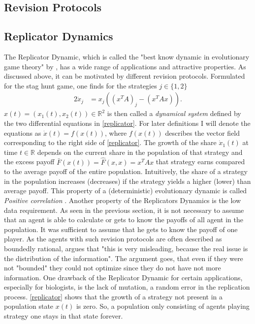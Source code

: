 \documentclass[12pt]{article}
\newcommand{\realnumb}{\mathbb{R}}
\begin{document}
\subsection{Revision Protocols}


\subsection{Replicator Dynamics}
The Replicator Dynamic, which is called the "best know dynamic in
evolutionary game theory" by \cite{sandholm_populaton_2010}, has a wide range of applications
and attractive properties. As discussed above, it can be motivated by 
different revision protocols. Formulated for the stag hunt game, one finds for
the strategies $j \in \{1,2\}$
\begin{alignat}{2}
        \dot{x}_j &= x_j\left(\left(x^T A\right)_j - \left(x^T A x\right)\right) 
        \label{replicator}.
\end{alignat}
$x(t)=(x_1(t), x_2(t)) \in \realnumb^2$ is then called a \textit{dynamical
system} defined by the two differential equations in \eqref{replicator}. For
later definitions I will denote the equations as $\dot{x}(t) = f(x(t))$, where
$f(x(t))$ describes the vector field corresponding to the right side of
\eqref{replicator}. 
The growth of the share $\dot{x}_1(t)$ at time $t \in \realnumb$ depends on the current share in the
population of that strategy and the excess payoff $\bar{F}(x(t)) 
= \hat{F}(x,x) = x^T A x$ that strategy earns 
compared to the average payoff of the entire population. Intuitively, the
share of a strategy in the population increases (decreases) if the strategy
yields a higher (lower) than average payoff. This property of a (deterministic)
evolutionary dynamic is called \textit{Positive correlation} \cite{sandholm}.
Another property of the Replicators Dynamics is the low data requirement. As 
seen in the previous section, it is not necessary to assume that an agent
is able to calculate or gets to know the payoffs of all agent in the population.
It was sufficient to assume that he gets to know the payoff of one player. 
As the agents with such revision protocols are often described as boundedly
rational, \cite{gintis} argues that "this is very misleading, because the real 
issue is the distribution of the information". The argument goes, that even
if they were not "bounded" they could not optimize since they do not have
not more information. 
One drawback of the Replicator Dynamic for certain applications, especially
for biologists, is the lack of mutation, a random error in the replication 
process.
\eqref{replicator} shows that the growth of a strategy not present in a 
population state $x(t)$ is zero. So, a population only consisting of agents
playing strategy one stays in that state forever. 
\end{document}
